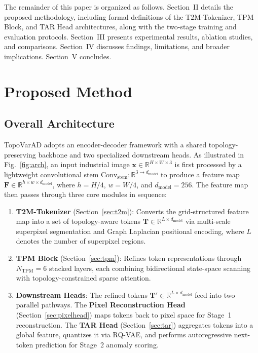 \documentclass[lettersize,journal]{IEEEtran}
\begin{document}
The remainder of this paper is organized as follows. Section~II details the proposed methodology, including formal definitions of the T2M-Tokenizer, TPM Block, and TAR Head architectures, along with the two-stage training and evaluation protocols. Section~III presents experimental results, ablation studies, and comparisons. Section~IV discusses findings, limitations, and broader implications. Section~V concludes.


\section{Proposed Method}
\label{sec:method}

\subsection{Overall Architecture}

TopoVarAD adopts an encoder-decoder framework with a shared topology-preserving backbone and two specialized downstream heads. As illustrated in Fig.~\ref{fig:arch}, an input industrial image $\mathbf{x} \in \mathbb{R}^{H \times W \times 3}$ is first processed by a lightweight convolutional stem $\text{Conv}_{\text{stem}}: \mathbb{R}^{3 \to d_{\text{model}}}$ to produce a feature map $\mathbf{F} \in \mathbb{R}^{h \times w \times d_{\text{model}}}$, where $h = H/4$, $w = W/4$, and $d_{\text{model}} = 256$. The feature map then passes through three core modules in sequence:

\begin{enumerate}
\item \textbf{T2M-Tokenizer} (Section~\ref{sec:t2m}): Converts the grid-structured feature map into a set of topology-aware tokens $\mathbf{T} \in \mathbb{R}^{L \times d_{\text{model}}}$ via multi-scale superpixel segmentation and Graph Laplacian positional encoding, where $L$ denotes the number of superpixel regions.
\item \textbf{TPM Block} (Section~\ref{sec:tpm}): Refines token representations through $N_{\text{TPM}} = 6$ stacked layers, each combining bidirectional state-space scanning with topology-constrained sparse attention.
\item \textbf{Downstream Heads}: The refined tokens $\mathbf{T}' \in \mathbb{R}^{L \times d_{\text{model}}}$ feed into two parallel pathways. The \textbf{Pixel Reconstruction Head} (Section~\ref{sec:pixelhead}) maps tokens back to pixel space for Stage~1 reconstruction. The \textbf{TAR Head} (Section~\ref{sec:tar}) aggregates tokens into a global feature, quantizes it via RQ-VAE, and performs autoregressive next-token prediction for Stage~2 anomaly scoring.
\end{enumerate}
\end{document}
